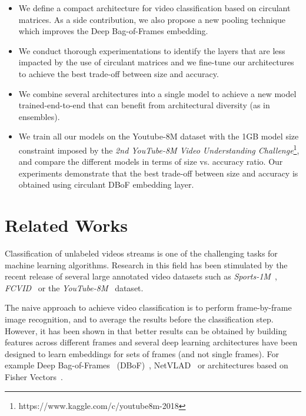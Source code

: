 \documentclass[runningheads]{llncs}
\newcommand{\yt}{\textit{YouTube-8M}\xspace}
\begin{document}
\begin{itemize}[noitemsep, topsep=0pt]
  \item We define a compact architecture for video classification based on circulant matrices. As a side contribution, we also propose a new pooling technique which improves the Deep Bag-of-Frames embedding. 
  \item We conduct thorough experimentations to identify the layers that are less impacted by the use of circulant matrices and we fine-tune our architectures to achieve the best trade-off between size and accuracy.  
  \item We combine several architectures into a single model to achieve a new model trained-end-to-end that can benefit from architectural diversity (as in ensembles).
  \item We train all our models on the Youtube-8M dataset with the 1GB model size constraint imposed by the \textit{2nd YouTube-8M Video Understanding Challenge}\footnote{https://www.kaggle.com/c/youtube8m-2018}, and compare the different models in terms of size vs. accuracy ratio. Our experiments demonstrate that the best trade-off between size and accuracy is obtained using circulant DBoF embedding layer.


\end{itemize}

\section{Related Works}
\label{sec:related-work}

Classification of unlabeled videos streams is one of the challenging tasks for machine learning algorithms.  Research in this field has been stimulated by the recent release of several large annotated video datasets such as \textit{Sports-1M}~\cite{karpathy2014large}, \textit{FCVID}~\cite{FCVID} or the \yt~\cite{45619} dataset.

The naive approach to achieve video classification is to perform frame-by-frame image recognition, and to average the results before the classification step. However, it has been shown in \cite{45619,DBLP:journals/corr/MiechLS17} that  better results can be obtained by building features across different frames and several deep learning architectures have been designed to learn embeddings for sets of frames (and not single frames). For example Deep Bag-of-Frames ~(DBoF)~\cite{45619}, NetVLAD~\cite{Arandjelovic16} or architectures based on Fisher Vectors~\cite{4270291}. 
\end{document}
